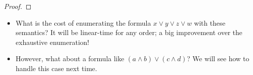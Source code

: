 \documentclass{tufte-handout}
\begin{document}
\begin{proof}



\end{proof}



\begin{itemize}
  \item What is the cost of enumerating the formula $x \lor y \lor z \lor w$ with these 
  semantics? It will be linear-time for any order; a big improvement over the 
  exhaustive enumeration!

  \item However, what about a formula like $(a \land b) \lor (c \land d)$? We will see how to 
  handle this case next time.
\end{itemize}


\end{document}
